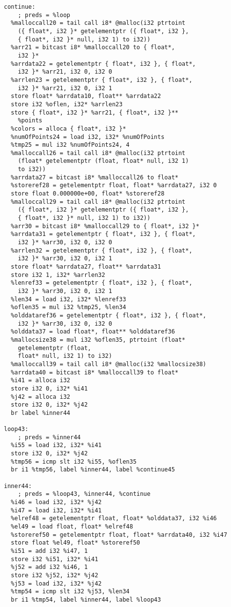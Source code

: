 \documentclass[main.tex]{subfiles}
\begin{document}
{\begin{lstlisting}
continue:                                         
    ; preds = %loop
  %malloccall20 = tail call i8* @malloc(i32 ptrtoint
    ({ float*, i32 }* getelementptr ({ float*, i32 },
    { float*, i32 }* null, i32 1) to i32))
  %arr21 = bitcast i8* %malloccall20 to { float*,
    i32 }*
  %arrdata22 = getelementptr { float*, i32 }, { float*,
    i32 }* %arr21, i32 0, i32 0
  %arrlen23 = getelementptr { float*, i32 }, { float*,
    i32 }* %arr21, i32 0, i32 1
  store float* %arrdata10, float** %arrdata22
  store i32 %oflen, i32* %arrlen23
  store { float*, i32 }* %arr21, { float*, i32 }**
    %points
  %colors = alloca { float*, i32 }*
  %numOfPoints24 = load i32, i32* %numOfPoints
  %tmp25 = mul i32 %numOfPoints24, 4
  %malloccall26 = tail call i8* @malloc(i32 ptrtoint 
    (float* getelementptr (float, float* null, i32 1)
    to i32))
  %arrdata27 = bitcast i8* %malloccall26 to float*
  %storeref28 = getelementptr float, float* %arrdata27, i32 0
  store float 0.000000e+00, float* %storeref28
  %malloccall29 = tail call i8* @malloc(i32 ptrtoint 
    ({ float*, i32 }* getelementptr ({ float*, i32 },
    { float*, i32 }* null, i32 1) to i32))
  %arr30 = bitcast i8* %malloccall29 to { float*, i32 }*
  %arrdata31 = getelementptr { float*, i32 }, { float*,
    i32 }* %arr30, i32 0, i32 0
  %arrlen32 = getelementptr { float*, i32 }, { float*,
    i32 }* %arr30, i32 0, i32 1
  store float* %arrdata27, float** %arrdata31
  store i32 1, i32* %arrlen32
  %lenref33 = getelementptr { float*, i32 }, { float*,
    i32 }* %arr30, i32 0, i32 1
  %len34 = load i32, i32* %lenref33
  %oflen35 = mul i32 %tmp25, %len34
  %olddataref36 = getelementptr { float*, i32 }, { float*,
    i32 }* %arr30, i32 0, i32 0
  %olddata37 = load float*, float** %olddataref36
  %mallocsize38 = mul i32 %oflen35, ptrtoint (float* 
    getelementptr (float,
    float* null, i32 1) to i32)
  %malloccall39 = tail call i8* @malloc(i32 %mallocsize38)
  %arrdata40 = bitcast i8* %malloccall39 to float*
  %i41 = alloca i32
  store i32 0, i32* %i41
  %j42 = alloca i32
  store i32 0, i32* %j42
  br label %inner44

loop43:                                           
    ; preds = %inner44
  %i55 = load i32, i32* %i41
  store i32 0, i32* %j42
  %tmp56 = icmp slt i32 %i55, %oflen35
  br i1 %tmp56, label %inner44, label %continue45

inner44:                                          
    ; preds = %loop43, %inner44, %continue
  %i46 = load i32, i32* %j42
  %i47 = load i32, i32* %i41
  %elref48 = getelementptr float, float* %olddata37, i32 %i46
  %el49 = load float, float* %elref48
  %storeref50 = getelementptr float, float* %arrdata40, i32 %i47
  store float %el49, float* %storeref50
  %i51 = add i32 %i47, 1
  store i32 %i51, i32* %i41
  %j52 = add i32 %i46, 1
  store i32 %j52, i32* %j42
  %j53 = load i32, i32* %j42
  %tmp54 = icmp slt i32 %j53, %len34
  br i1 %tmp54, label %inner44, label %loop43


\end{lstlisting}}
\end{document}
